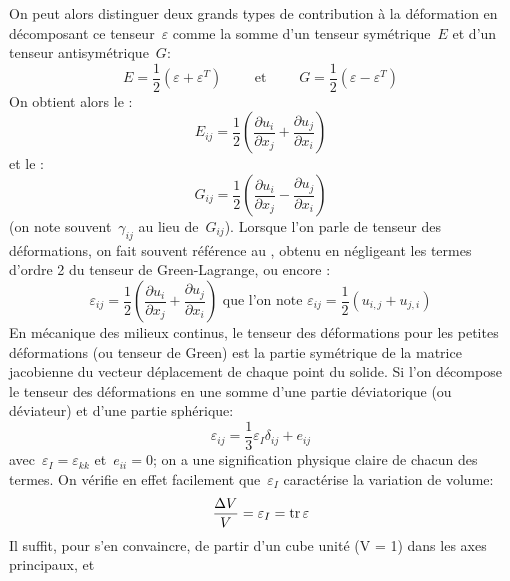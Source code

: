 \medskip
On peut alors distinguer deux grands types de contribution à la déformation en décomposant
ce tenseur~$\varepsilon$ comme la somme d'un tenseur symétrique~$E$ et d'un tenseur antisymétrique~$G$:
\begin{equation} E=\frac12(\varepsilon+\varepsilon^T) \qquad \text{ et }\qquad G=\frac12(\varepsilon-\varepsilon^T) \end{equation}
On obtient alors le :
\begin{equation}E_{ij}=\frac12\left(\frac{\partial u_i}{\partial x_j}+\frac{\partial u_j}{\partial x_i}\right)\end{equation}
et le :
\begin{equation}G_{ij}=\frac12\left(\frac{\partial u_i}{\partial x_j}-\frac{\partial u_j}{\partial x_i}\right)\end{equation} (on note
souvent~$\gamma_{ij}$ au lieu de~$G_{ij}$).
\medskipvm
Lorsque l'on parle de tenseur des déformations, on fait souvent référence au , obtenu en négligeant
les termes d'ordre 2 du tenseur de Green-Lagrange, ou encore :
\begin{equation}
\varepsilon_{ij}=\frac12\left(\frac{\partial u_i}{\partial x_j}+\frac{\partial u_j}{\partial x_i}\right)
\text{ que l'on note }
\varepsilon_{ij}=\frac12(u_{i,j}+u_{j,i})
\end{equation}
\medskipvm
En mécanique des milieux continus, le tenseur des déformations pour les petites déformations
(ou tenseur de Green) est la partie symétrique de la matrice jacobienne du vecteur déplacement
de chaque point du solide.
\medskipvm
Si l'on décompose le tenseur des déformations en une somme d'une partie déviatorique
(ou déviateur) et d'une partie sphérique:
\begin{equation} \varepsilon_{ij}=\frac13\varepsilon_I\delta_{ij}+e_{ij} \end{equation}
avec~$\varepsilon_I=\varepsilon_{kk}$ et~$e_{ii}=0$;
on a une signification physique claire de chacun des termes.
On vérifie en effet facilement que~$\varepsilon_I$ caractérise la variation de volume:
\begin{equation} \frac{\Delta V}V=\varepsilon_I=\operatorname{tr} \varepsilon \end{equation}
 Il suffit, pour s'en convaincre, de partir d'un cube unité (V = 1) dans les axes principaux, et
